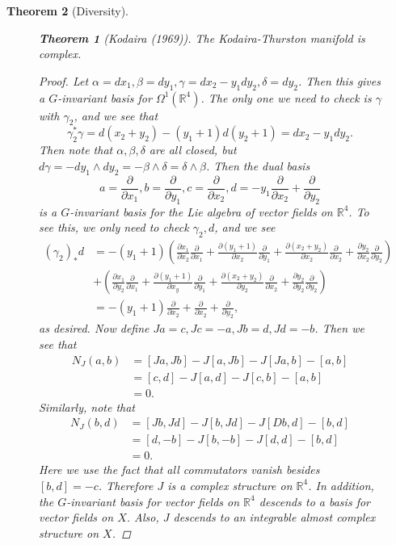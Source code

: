 \documentclass[leqno, openany]{memoir}
\newtheorem{thm}{Theorem}[chapter]
\theoremstyle{definition}
\theoremstyle{remark}
\theoremstyle{plain}
\theoremstyle{definition}
\theoremstyle{remark}
\newcommand{\R}{\mathbb{R}}
\begin{document}
\begin{thm}[Diversity]
\begin{figure}[H]
\begin{thm}[Kodaira (1969)] The Kodaira-Thurston manifold is complex.
\end{thm}

\begin{proof} Let $\alpha = dx_1, \beta = dy_1, \gamma = dx_2 - y_1 dy_2,
    \delta = dy_2$. Then this gives a $G$-invariant basis for $\Omega^1(\R^4)$.
    The only one we need to check is $\gamma$ with $\gamma_2$, and we see that
    \[ \gamma_2^* \gamma = d(x_2 + y_2) - (y_1 + 1)d (y_2 + 1) = dx_2 - y_1
    dy_2. \] Then note that $\alpha, \beta, \delta$ are all closed, but $d
    \gamma = -dy_1 \wedge dy_2 = - \beta \wedge \delta = \delta \wedge \beta$.
    Then the dual basis \[ a = \frac{\partial}{\partial x_1}, b =
    \frac{\partial}{\partial y_1}, c = \frac{\partial}{\partial x_2}, d = -y_1
\frac{\partial}{\partial x_2} + \frac{\partial}{\partial y_2} \] is a
$G$-invariant basis for the Lie algebra of vector fields on $\R^4$. To see
this, we only need to check $\gamma_2, d$, and we see \begin{align*}
    (\gamma_2)_* d &= -(y_1 + 1) \left( \frac{\partial x_1 }{\partial x_2}
    \frac{\partial}{\partial x_1} + \frac{\partial (y_1 + 1)}{\partial x_2}
\frac{\partial}{\partial y_1} + \frac{\partial (x_2 + y_2)}{\partial x_2}
\frac{\partial}{\partial x_2} + \frac{\partial y_2}{\partial x_2}
\frac{\partial}{\partial y_2} \right) \\ &+ \left( \frac{\partial x_1
}{\partial y_2} \frac{\partial}{\partial x_1} + \frac{\partial (y_1 +
1)}{\partial x_y} \frac{\partial}{\partial y_1} + \frac{\partial (x_2 +
y_2)}{\partial y_2} \frac{\partial}{\partial x_2} + \frac{\partial
y_2}{\partial y_2} \frac{\partial}{\partial y_2} \right) \\ &= -(y_1 + 1)
\frac{\partial}{\partial x_2} + \frac{\partial}{\partial x_2} +
\frac{\partial}{\partial y_2}, \end{align*} as desired. Now define $Ja = c, Jc
= -a, Jb = d, Jd = -b$. Then we see that \begin{align*} N_J(a,b) &= [Ja, Jb] -
    J[a,Jb] - J[Ja,b] - [a,b] \\ &= [c,d] - J[a,d] - J[c,b] - [a,b] \\ &= 0.
    \end{align*} Similarly, note that \begin{align*} N_J(b,d) &= [Jb, Jd] -
    J[b,Jd] - J[Db,d] - [b,d] \\ &= [d,-b] - J[b,-b] - J[d,d] - [b,d] \\ &= 0.
\end{align*} Here we use the fact that all commutators vanish besides $[b,d] =
-c$. Therefore $J$ is a complex structure on $\R^4$. In addition, the
$G$-invariant basis for vector fields on $\R^4$ descends to a basis for vector
fields on $X$. Also, $J$ descends to an integrable almost complex structure on
$X$.  \end{proof}


\end{figure}
\end{thm}
\end{document}
